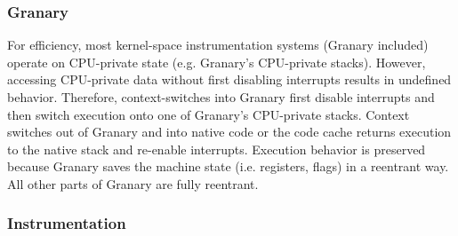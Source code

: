 \documentclass[preprint]{sigplanconf}
\begin{document}

\subsubsection{Granary}
For efficiency, most kernel-space instrumentation systems (Granary included) operate on CPU-private state (e.g. Granary's CPU-private stacks). However, accessing CPU-private data without first disabling interrupts results in undefined behavior. Therefore, context-switches into Granary first disable interrupts and then switch execution onto one of Granary's CPU-private stacks. Context switches out of Granary and into native code or the code cache returns execution to the native stack and re-enable interrupts. Execution behavior is preserved because Granary saves the machine state (i.e. registers, flags) in a reentrant way. All other parts of Granary are fully reentrant.




\subsubsection{Instrumentation}\label{sec:interrupt_delay}
\end{document}
